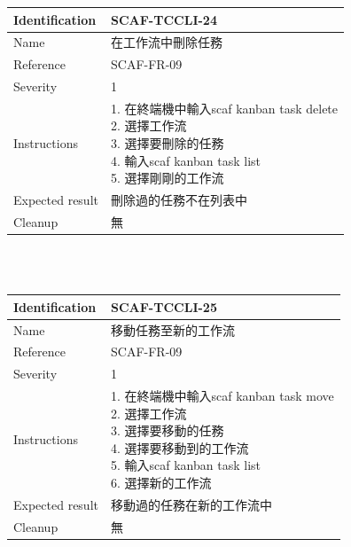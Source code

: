 \documentclass{report}
\begin{document}
\begin{tabularx}{\textwidth}{
  |p{}%
  |p{}|%
  }
  \hline
  \centering Identification &  SCAF-TCCLI-24 \\
  \hline
  \centering Name & 在工作流中刪除任務 \\
  \hline
  \centering Reference & SCAF-FR-09 \\
  \hline
  \centering Severity & 1 \\
  \hline
  \centering Instructions & 
  \makecell[l]{
    1. 在終端機中輸入scaf kanban task delete \\
    2. 選擇工作流 \\
    3. 選擇要刪除的任務 \\
    4. 輸入scaf kanban task list \\
    5. 選擇剛剛的工作流 \\
  }\\
  \hline
  \centering Expected result & 刪除過的任務不在列表中 \\
  \hline
  \centering Cleanup & 無 \\
  \hline
\end{tabularx}
\\
\newline
\\

\begin{tabularx}{\textwidth}{
  |p{}%
  |p{}|%
  }
  \hline
  \centering Identification &  SCAF-TCCLI-25 \\
  \hline
  \centering Name & 移動任務至新的工作流 \\
  \hline
  \centering Reference & SCAF-FR-09 \\
  \hline
  \centering Severity & 1 \\
  \hline
  \centering Instructions & 
  \makecell[l]{
    1. 在終端機中輸入scaf kanban task move \\
    2. 選擇工作流 \\
    3. 選擇要移動的任務 \\
    4. 選擇要移動到的工作流 \\
    5. 輸入scaf kanban task list \\
    6. 選擇新的工作流 \\
  }\\
  \hline
  \centering Expected result & 移動過的任務在新的工作流中\\
  \hline
  \centering Cleanup & 無 \\
  \hline
\end{tabularx}
\\
\newline
\\
\end{document}
